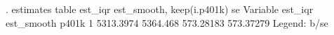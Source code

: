 . estimates table est_iqr est_smooth, keep(i.p401k) se
{\smallskip}
    Variable {\VBAR}  est_iqr     est_smooth  
       p401k {\VBAR}
          1  {\VBAR}  5313.3974     5364.468  
             {\VBAR}  573.28183    573.37279  
                            Legend: b/se
